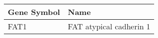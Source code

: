 \begin{tabular}{ll}
\toprule
Gene Symbol &                    Name \\
\midrule
       FAT1 & FAT atypical cadherin 1 \\
\bottomrule
\end{tabular}

